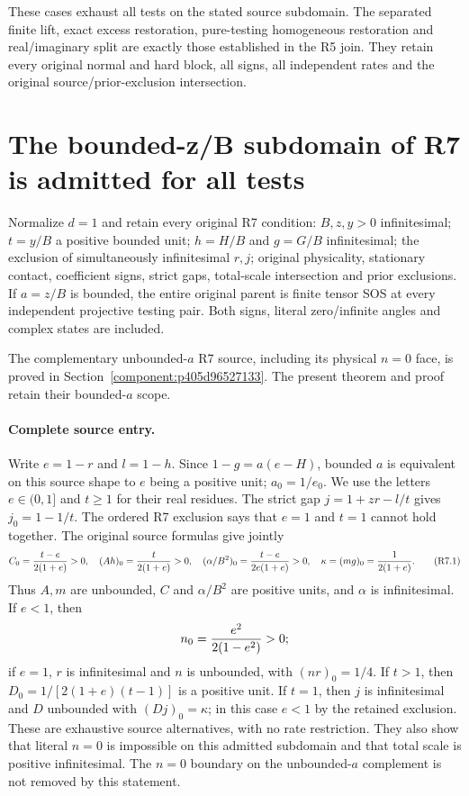 These cases exhaust all tests on the stated source subdomain. The
separated finite lift, exact excess restoration, pure-testing homogeneous
restoration and real/imaginary split are exactly those established in
the R5 join. They retain every original normal and hard block, all signs,
all independent rates and the original source/prior-exclusion intersection.


\section{\texorpdfstring{The bounded-z/B subdomain of R7 is admitted for all tests}{The bounded-z/B subdomain of R7 is admitted for all tests}}
\label{component:p9a223c96c696}

\label{p9a223c96c696:sec:r17-r7-bounded-a}
\begin{theorem}
Normalize $d=1$ and retain every original R7 condition: $B,z,y>0$
infinitesimal; $t=y/B$ a positive bounded unit; $h=H/B$ and $g=G/B$
infinitesimal; the exclusion of simultaneously infinitesimal $r,j$;
original physicality, stationary contact, coefficient signs, strict gaps,
total-scale intersection and prior exclusions. If $a=z/B$ is bounded,
the entire original parent is finite tensor SOS at every independent
projective testing pair. Both signs, literal zero/infinite angles and
complex states are included.
\end{theorem}
The complementary unbounded-$a$ R7 source, including its physical
$n=0$ face, is proved in Section~\ref{component:p405d96527133}.
The present theorem and proof retain their bounded-$a$ scope.

\paragraph{Complete source entry.}
Write $e=1-r$ and $l=1-h$. Since $1-g=a(e-H)$, bounded $a$ is equivalent
on this source shape to $e$ being a positive unit; $a_0=1/e_0$.
We use the letters $e\in(0,1]$ and $t\ge1$ for their real residues.
The strict gap $j=1+zr-l/t$ gives $j_0=1-1/t$. The ordered R7 exclusion
says that $e=1$ and $t=1$ cannot hold together. The original source formulas
give jointly
\[
 C_0={t-e\over2(1+e)}>0,\quad
 (Ah)_0={t\over2(1+e)}>0,\quad
 (\alpha/B^2)_0={t-e\over2e(1+e)}>0,\quad
 \kappa=(mg)_0={1\over2(1+e)}.                        \tag{R7.1}
\]
Thus $A,m$ are unbounded, $C$ and $\alpha/B^2$ are positive units,
and $\alpha$ is infinitesimal. If $e<1$, then
\[
 n_0={e^2\over2(1-e^2)}>0;
\]
if $e=1$, $r$ is infinitesimal and $n$ is unbounded, with $(nr)_0=1/4$.
If $t>1$, then $D_0=1/[2(1+e)(t-1)]$ is a positive unit. If $t=1$,
then $j$ is infinitesimal and $D$ unbounded with $(Dj)_0=\kappa$;
in this case $e<1$ by the retained exclusion. These are exhaustive
source alternatives, with no rate restriction. They also show that
literal $n=0$ is impossible on this admitted subdomain and that total
scale is positive infinitesimal. The $n=0$ boundary on the unbounded-$a$
complement is not removed by this statement.

